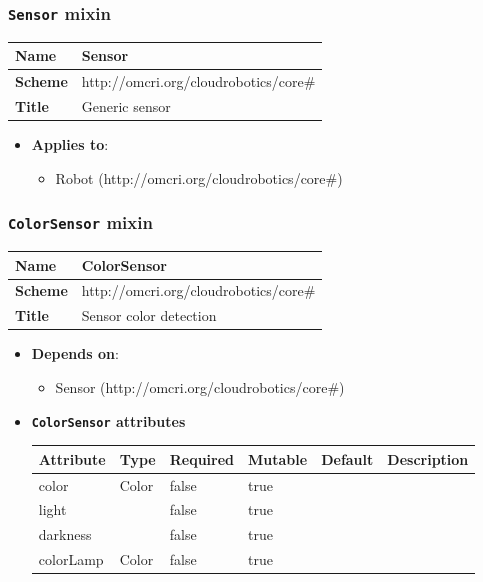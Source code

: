  
\subsubsection{\texttt{Sensor} mixin}
\begin{center}
\begin{tabular}{|l|l|}
  \hline
  \textbf{Name} & Sensor \\
  \hline  
  \textbf{Scheme} & http://omcri.org/cloudrobotics/core\# \\
  \hline
  \textbf{Title} & Generic sensor \\
  \hline
\end{tabular}
\end{center}
\begin{itemize}
\item \textbf{Applies to}:
\begin{itemize}
	\item Robot (http://omcri.org/cloudrobotics/core\#)
\end{itemize}
\end{itemize} 



 
\subsubsection{\texttt{ColorSensor} mixin}
\begin{center}
\begin{tabular}{|l|l|}
  \hline
  \textbf{Name} & ColorSensor \\
  \hline  
  \textbf{Scheme} & http://omcri.org/cloudrobotics/core\# \\
  \hline
  \textbf{Title} & Sensor color detection \\
  \hline
\end{tabular}
\end{center}

\begin{itemize}
\item \textbf{Depends on}:
\begin{itemize}
	\item Sensor (http://omcri.org/cloudrobotics/core\#)
\end{itemize}
\end{itemize}

\begin{itemize}
\item \textbf{\texttt{ColorSensor} attributes}

\begin{tabularx}{\textwidth}{|l|l|p{1.4cm}|p{1.3cm}|l|X|}
  \hline
  \textbf{Attribute} & \textbf{Type} & \textbf{Required} & \textbf{Mutable} & \textbf{Default} & \textbf{Description} \\
  \hline  
  color & Color & false & true &  &  \\
  \hline
  light &  & false & true &  &  \\
  \hline
  darkness &  & false & true &  &  \\
  \hline
  colorLamp & Color & false & true &  &  \\
  \hline
\end{tabularx}
\end{itemize}

